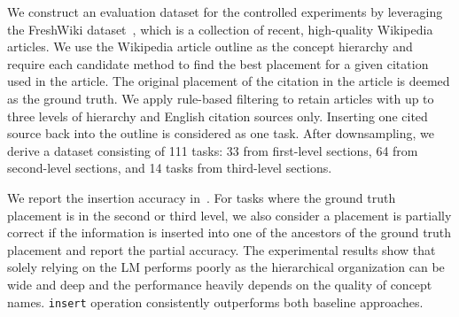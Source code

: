 





We construct an evaluation dataset for the controlled experiments by leveraging the FreshWiki dataset~\citep{shao2024assisting}, which is a collection of recent, high-quality Wikipedia articles. We use the Wikipedia article outline as the concept hierarchy and require each candidate method to find the best placement for a given citation used in the article. The original placement of the citation in the article is deemed as the ground truth. We apply rule-based filtering to retain articles with up to three levels of hierarchy and English citation sources only. Inserting one cited source back into the outline is considered as one task. After downsampling, we derive a dataset consisting of 111 tasks: 33 from first-level sections, 64 from second-level sections, and 14 tasks from third-level sections.

We report the insertion accuracy in~. For tasks where the ground truth placement is in the second or third level, we also consider a placement is partially correct if the information is inserted into one of the ancestors of the ground truth placement and report the partial accuracy. The experimental results show that solely relying on the LM performs poorly as the hierarchical organization can be wide and deep and the performance heavily depends on the quality of concept names. \system \texttt{insert} operation consistently outperforms both baseline approaches.


